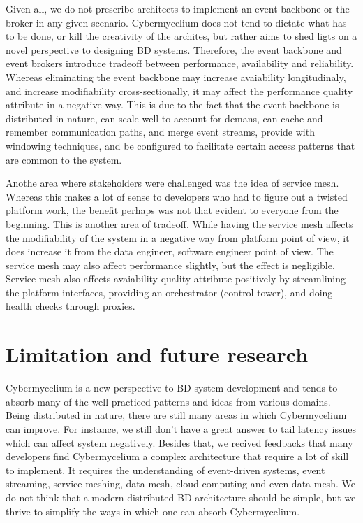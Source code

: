 \documentclass[review]{elsarticle}
\begin{document}
Given all, we do not prescribe architects to implement an event backbone or the broker in any given scenario. Cybermycelium does not tend to dictate what has to be done, or kill the creativity of the archites, but rather aims to shed ligts on a novel perspective to designing BD systems. Therefore, the event backbone and event brokers introduce tradeoff between performance, availability and reliability. Whereas eliminating the event backbone may increase avaiability longitudinaly, and increase modifiability cross-sectionally, it may affect the performance quality attribute in a negative way. This is due to the fact that the event backbone is distributed in nature, can scale well to account for demans, can cache and remember communication paths, and merge event streams, provide with windowing techniques, and be configured to facilitate certain access patterns that are common to the system.

Anothe area where stakeholders were challenged was the idea of service mesh. Whereas this makes a lot of sense to developers who had to figure out a twisted platform work, the benefit perhaps was not that evident to everyone from the beginning. This is another area of tradeoff. While having the service mesh affects the modifiability of the system in a negative way from platform point of view, it does increase it from the data engineer, software engineer point of view. The service mesh may also affect performance slightly, but the effect is negligible. Service mesh also affects avaiability quality attribute positively by streamlining the platform interfaces, providing an orchestrator (control tower), and doing health checks through proxies.

\section{Limitation and future research}

Cybermycelium is a new perspective to BD system development and tends to absorb many of the well practiced patterns and ideas from various domains. Being distributed in nature, there are still many areas in which Cybermycelium can improve. For instance, we still don't have a great answer to tail latency issues which can affect system negatively. Besides that, we recived feedbacks that many developers find Cybermycelium a complex architecture that require a lot of skill to implement. It requires the understanding of event-driven systems, event streaming, service meshing, data mesh, cloud computing and even data mesh. We do not think that a modern distributed BD architecture should be simple, but we thrive to simplify the ways in which one can absorb Cybermycelium.
\end{document}
